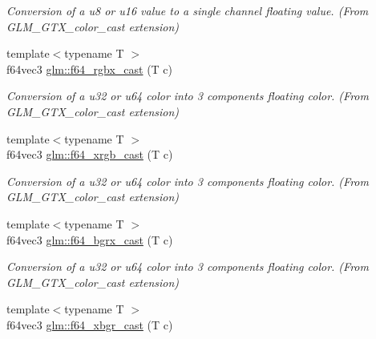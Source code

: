 \begin{DoxyCompactItemize}
\begin{DoxyCompactList}\small\item\em Conversion of a u8 or u16 value to a single channel floating value. (From G\+L\+M\+\_\+\+G\+T\+X\+\_\+color\+\_\+cast extension) \end{DoxyCompactList}\item 
\hypertarget{group__gtx__color__cast_ga5a8f7e68a814512e1496766b89512151}{}{\footnotesize template$<$typename T $>$ }\\f64vec3 \hyperlink{group__gtx__color__cast_ga5a8f7e68a814512e1496766b89512151}{glm\+::f64\+\_\+rgbx\+\_\+cast} (T c)\label{group__gtx__color__cast_ga5a8f7e68a814512e1496766b89512151}

\begin{DoxyCompactList}\small\item\em Conversion of a u32 or u64 color into 3 components floating color. (From G\+L\+M\+\_\+\+G\+T\+X\+\_\+color\+\_\+cast extension) \end{DoxyCompactList}\item 
\hypertarget{group__gtx__color__cast_ga8b28e89ee5043c947664ef46ef5cff12}{}{\footnotesize template$<$typename T $>$ }\\f64vec3 \hyperlink{group__gtx__color__cast_ga8b28e89ee5043c947664ef46ef5cff12}{glm\+::f64\+\_\+xrgb\+\_\+cast} (T c)\label{group__gtx__color__cast_ga8b28e89ee5043c947664ef46ef5cff12}

\begin{DoxyCompactList}\small\item\em Conversion of a u32 or u64 color into 3 components floating color. (From G\+L\+M\+\_\+\+G\+T\+X\+\_\+color\+\_\+cast extension) \end{DoxyCompactList}\item 
\hypertarget{group__gtx__color__cast_ga54480b66922c429da8d533e6970b1a71}{}{\footnotesize template$<$typename T $>$ }\\f64vec3 \hyperlink{group__gtx__color__cast_ga54480b66922c429da8d533e6970b1a71}{glm\+::f64\+\_\+bgrx\+\_\+cast} (T c)\label{group__gtx__color__cast_ga54480b66922c429da8d533e6970b1a71}

\begin{DoxyCompactList}\small\item\em Conversion of a u32 or u64 color into 3 components floating color. (From G\+L\+M\+\_\+\+G\+T\+X\+\_\+color\+\_\+cast extension) \end{DoxyCompactList}\item 
\hypertarget{group__gtx__color__cast_ga6bd5ec6df79fc3b188e14e03084c8ebc}{}{\footnotesize template$<$typename T $>$ }\\f64vec3 \hyperlink{group__gtx__color__cast_ga6bd5ec6df79fc3b188e14e03084c8ebc}{glm\+::f64\+\_\+xbgr\+\_\+cast} (T c)\label{group__gtx__color__cast_ga6bd5ec6df79fc3b188e14e03084c8ebc}


\end{DoxyCompactItemize}
